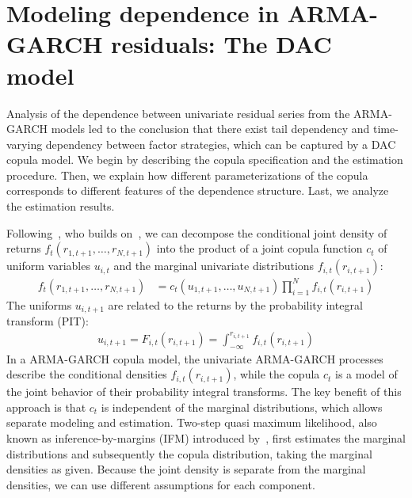 
\section{Modeling dependence in ARMA-GARCH residuals: The DAC model} %
\label{sec:dac_copula}

Analysis of the dependence between univariate residual series from the ARMA-GARCH models led to the conclusion that there exist tail dependency and time-varying dependency between factor strategies, which can be captured by a DAC copula model. We begin by describing the copula specification and the estimation procedure. Then, we explain how different parameterizations of the copula corresponds to different features of the dependence structure. Last, we analyze the estimation results.

Following~\autocite{ChristoffersenErrunzaJacobLanglois2012}, who builds on~\autocite{Patton2006,Sklar1959}, we can decompose the conditional joint density of returns $f_t(r_{1, t+1}, \ldots, r_{N, t+1})$ into the product of a joint copula function $c_t$ of uniform variables $u_{i,t}$ and the marginal univariate distributions $f_{i,t}(r_{i, t+1})$:
\begin{align}
  f_t(r_{1, t+1}, \ldots, r_{N, t+1}) &=
    c_t(u_{1, t+1}, \ldots, u_{N, t+1}) \prod^N_{i = 1}
    f_{i,t}(r_{i, t + 1})
\end{align}
The uniforms $u_{i, t+1}$ are related to the returns by the probability integral transform (PIT):
\begin{align}
  u_{i, t+1} = F_{i,t}(r_{i, t+1}) =
    \int_{-\infty}^{r_{i, t + 1}} f_{i,t}(r_{i, t+1})
\end{align}
In a ARMA-GARCH copula model, the univariate ARMA-GARCH processes describe the conditional densities $f_{i,t}(r_{i, t+1})$, while the copula $c_t$ is a model of the joint behavior of their probability integral transforms. The key benefit of this approach is that $c_t$ is independent of the marginal distributions, which allows separate modeling and estimation. Two-step quasi maximum likelihood, also known as inference-by-margins (IFM) introduced by~\autocite{Joe1997}, first estimates the marginal distributions and subsequently the copula distribution, taking the marginal densities as given. Because the joint density is separate from the marginal densities, we can use different assumptions for each component.

